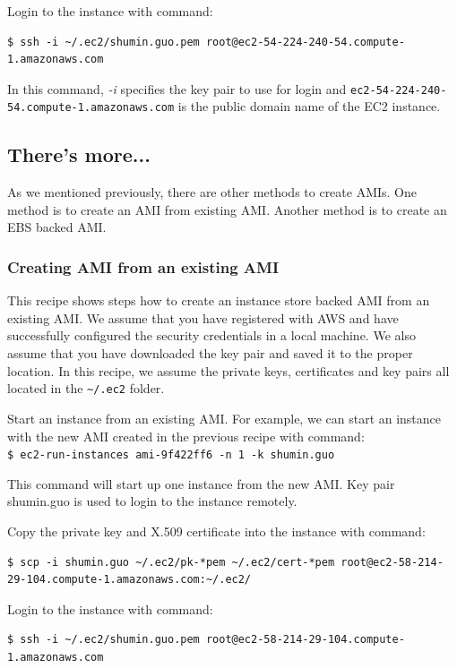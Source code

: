 
Login to the instance with command:
\lstset{style=bashstyle}
\begin{lstlisting}
$ ssh -i ~/.ec2/shumin.guo.pem root@ec2-54-224-240-54.compute-1.amazonaws.com
\end{lstlisting}

In this command, \emph{-i} specifies the key pair to use for login and \verb|ec2-54-224-240-54.compute-1.amazonaws.com| is the public domain name of the EC2 instance.

\subsection*{There's more...}
As we mentioned previously, there are other methods to create AMIs. One method is to create an AMI from existing AMI. Another method is to create an EBS backed AMI.

\subsubsection*{Creating AMI from an existing AMI}
This recipe shows steps how to create an instance store backed AMI from an existing AMI. We assume that you have registered with AWS and have successfully configured the security credentials in a local machine. We also assume that you have downloaded the key pair and saved it to the proper location. In this recipe, we assume the private keys, certificates and key pairs all located in the \verb|~/.ec2| folder.

Start an instance from an existing AMI. For example, we can start an instance with the new AMI created in the previous recipe with command: \\
\verb|$ ec2-run-instances ami-9f422ff6 -n 1 -k shumin.guo|

This command will start up one instance from the new AMI. Key pair shumin.guo is used to login to the instance remotely.


Copy the private key and X.509 certificate into the instance with command:
\lstset{style=bashstyle}
\begin{lstlisting}
$ scp -i shumin.guo ~/.ec2/pk-*pem ~/.ec2/cert-*pem root@ec2-58-214-29-104.compute-1.amazonaws.com:~/.ec2/
\end{lstlisting}

Login to the instance with command:
\lstset{style=bashstyle}
\begin{lstlisting}
$ ssh -i ~/.ec2/shumin.guo.pem root@ec2-58-214-29-104.compute-1.amazonaws.com
\end{lstlisting}

